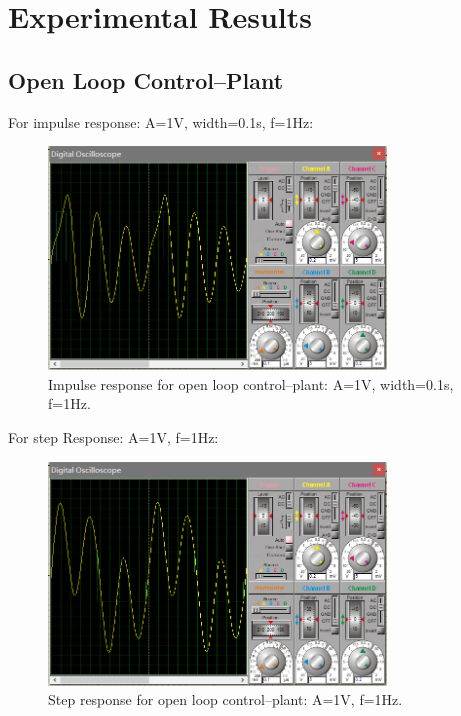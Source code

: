 \documentclass[a4paper]{article}
\begin{document}
\section{Experimental Results}
\subsection{Open Loop Control--Plant}
For impulse response: A=1V, width=0.1s, f=1Hz:
\begin{figure}[H]
    \begin{center}
        \includegraphics[width=0.8\textwidth]{9.png}
    \end{center}
    \caption{Impulse response for open loop control--plant: A=1V, width=0.1s, f=1Hz.}
\end{figure}
For step Response: A=1V, f=1Hz:
\begin{figure}[H]
    \begin{center}
        \includegraphics[width=0.8\textwidth]{10.png}
    \end{center}
    \caption{Step response for open loop control--plant: A=1V, f=1Hz.}
\end{figure}
\end{document}
